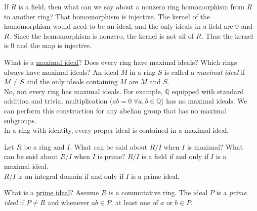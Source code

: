 \documentclass[avery5371,grid]{flashcards}
\newcommand{\Q}{\mathbb{Q}}
\begin{document}
\begin{flashcard}[Rings]{If $R$ is a field, then what can we say about a nonzero ring homomorphism from $R$ to another ring?}
 That homomorphism is injective. The kernel of the homomorphism would need to be an ideal, and the only ideals in a field are 0 and $R$. Since the homomorphism is nonzero, the kernel is not all of $R$. Thus the kernel is 0 and the map is injective.
\end{flashcard}

\begin{flashcard}[Rings]{What is a \underline{maximal ideal}? Does every ring have maximal ideals? Which rings always have maximal ideals?}
 An ideal $M$ in a ring $S$ is called a \emph{maximal ideal} if $M \neq S$ and the only ideals containing $M$ are $M$ and $S$.\\
 
 No, not every ring has maximal ideals. For example, $\Q$ equipped with standard addition and trivial multiplication ($ab = 0 \; \forall a,b \in \Q$) has no maximal ideals. We can perform this construction for any abelian group that has no maximal subgroups.\\
 
 In a ring with identity, every proper ideal is contained in a maximal ideal.
\end{flashcard}

\begin{flashcard}[Rings]{Let $R$ be a ring and $I$. What can be said about $R/I$ when $I$ is maximal? What can be said about $R/I$ when $I$ is prime?}
 $R/I$ is a field if and only if $I$ is a maximal ideal.\\
 
 $R/I$ is an integral domain if and only if $I$ is a prime ideal.
\end{flashcard}

\begin{flashcard}[Rings]{What is a \underline{prime ideal}?}
 Assume $R$ is a commutative ring. The ideal $P$ is a \emph{prime ideal} if $P \neq R$ and whenever $ab \in P$, at least one of $a$ or $b \in P$.
\end{flashcard}
\end{document}
